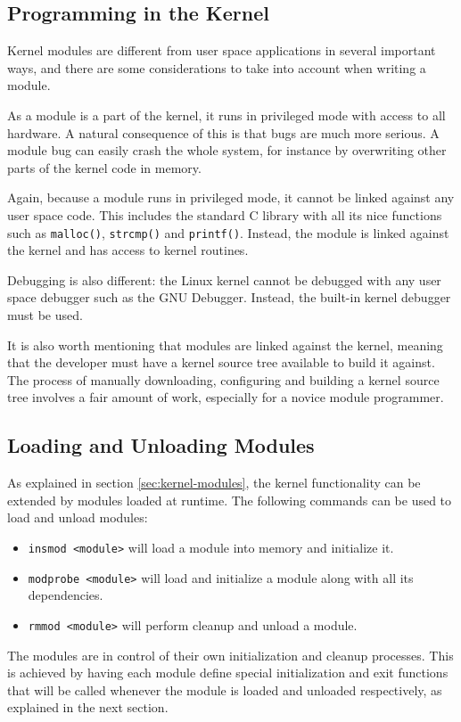 \subsection{Programming in the Kernel}
Kernel modules are different from user space applications in several important ways, and there are some considerations to take into account when writing a module.

As a module is a part of the kernel, it runs in privileged mode with access to all hardware. A natural consequence of this is that bugs are much more serious. A module bug can easily crash the whole system, for instance by overwriting other parts of the kernel code in memory.

Again, because a module runs in privileged mode, it cannot be linked against any user space code. This includes the standard C library with all its nice functions such as \texttt{malloc()}, \texttt{strcmp()} and \texttt{printf()}. Instead, the module is linked against the kernel and has access to kernel routines.

Debugging is also different: the Linux kernel cannot be debugged with any user space debugger such as the GNU Debugger. Instead, the built-in kernel debugger must be used.

It is also worth mentioning that modules are linked against the kernel, meaning that the developer must have a kernel source tree available to build it against. The process of manually downloading, configuring and building a kernel source tree involves a fair amount of work, especially for a novice module programmer.


\subsection{Loading and Unloading Modules}
As explained in section \ref{sec:kernel-modules}, the kernel functionality can be extended by modules loaded at runtime. The following commands can be used to load and unload modules:
\begin{itemize}
  \item \texttt{insmod <module>} will load a module into memory and initialize it.
  \item \texttt{modprobe <module>} will load and initialize a module along with all its dependencies.
  \item \texttt{rmmod <module>} will perform cleanup and unload a module.
\end{itemize}
The modules are in control of their own initialization and cleanup processes. This is achieved by having each module define special initialization and exit functions that will be called whenever the module is loaded and unloaded respectively, as explained in the next section.


